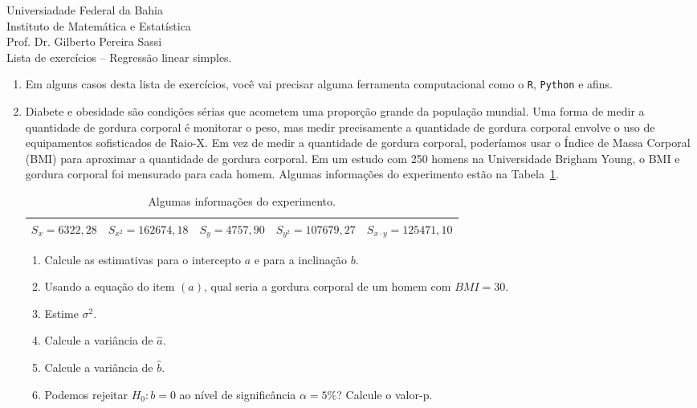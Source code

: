 \documentclass[12pt, a4paper]{article}
\begin{document}
\begin{center}
Universiadade Federal da Bahia\\
Instituto de Matemática e Estatística\\
Prof. Dr. Gilberto Pereira Sassi\\
\vspace{1cm}
Lista de exercícios -- Regressão linear simples.
\vspace{1cm}
\end{center}

\begin{enumerate}
	\item[] Em alguns casos desta lista de exercícios, você vai precisar alguma ferramenta computacional como o \texttt{R}, \texttt{Python} e afins.
	
	\item Diabete e obesidade são condições sérias que acometem uma proporção grande da população mundial. Uma forma de medir a quantidade de gordura corporal é monitorar o peso, mas medir precisamente a quantidade de gordura corporal envolve o uso de equipamentos sofisticados de Raio-X. Em vez de medir a quantidade de gordura corporal, poderíamos usar o Índice de Massa Corporal (BMI) para aproximar a quantidade de gordura corporal. Em um estudo com 250 homens na Universidade Brigham Young, o BMI e gordura corporal foi mensurado para cada homem. Algumas informações do experimento estão na Tabela~\ref{tab:bmi-fat}.
	\begin{table}[htbp]
		\centering
		\begin{tabular}{ccccc}
			\toprule[0.05cm]
			$S_x =   6322,28 $ & $S_{x^2} = 162674,18$ & $S_y =  4757,90 $ & $S_{y^2} =  107679,27$ & $S_{x \cdot y} =125471,10$\\
			\bottomrule[0.05cm]
		\end{tabular}
		\caption{Algumas informações do experimento.}
		\label{tab:bmi-fat}
	\end{table}
	\begin{enumerate}
		\item Calcule as estimativas para o intercepto $a$ e para a inclinação $b$.
		\item Usando a equação do item $(a)$, qual seria a gordura corporal de um homem com $BMI=30$.
		\item Estime $\sigma^2$.
		\item Calcule a variância de $\hat{a}$.
		\item Calcule a variância de $\hat{b}$.
		\item Podemos rejeitar $H_0: b =0$ ao nível de significância $\alpha  = 5\%$? Calcule o valor-p.

\end{enumerate}
\end{enumerate}
\end{document}
